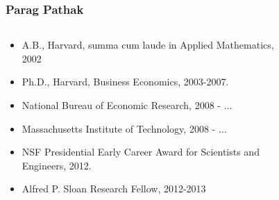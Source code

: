 \documentclass[10pt,pdf,hyperref={unicode}]{beamer}
\begin{document}
\begin{frame}
    \frametitle{Parag Pathak}
    \begin{columns}
        \begin{column}{.5\textwidth}
            \begin{itemize}
                \item A.B., Harvard, summa cum laude in Applied Mathematics, 2002
                \item Ph.D., Harvard, Business Economics, 2003-2007.
                \item National Bureau of Economic Research, 2008 - $\dots$
                \item Massachusetts Institute of Technology, 2008 - $\dots$
                \item NSF Presidential Early Career Award for Scientists and Engineers, 2012.
                \item Alfred P. Sloan Research Fellow, 2012-2013
            \end{itemize}
        \end{column}
        \begin{column}{.5\textwidth}
            \begin{figure}[H]
                \noindent{}
            \end{figure}
        \end{column}
    \end{columns}
\end{frame}
\end{document}
